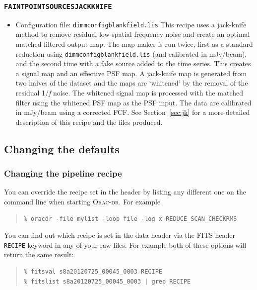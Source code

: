 \documentclass[twoside,11pt]{article}
\newcommand{\htmladdnormallink}[2]{#1}
\newcommand{\htmlref}[2]{#1}
\newcommand{\latexhtml}[2]{#1}
\newcommand{\xlabel}[1]{}
\renewcommand{\_}{\texttt{\symbol{95}}}
\newenvironment{myquote}{
   \color{MidnightBlue}\begin{quote}\begin{small}}{
   \end{small}\end{quote}
}
\newcommand{\oracdr}{\htmladdnormallink{\textsc{Orac-dr}}{http://www.oracdr.org/oracdr}}
\newcommand{\drrecipe}[1]{\texttt{#1}}
\newcommand{\file}[1]{\texttt{#1}}
\newcommand{\cref}[3]{\latexhtml{#1~\ref{#2}}{\htmlref{#3}{#2}}}
\renewenvironment{myquote}{
      \begin{quote}\begin{small}}{
      \end{small}\end{quote}
   }
\begin{document}
\subsubsection{\xlabel{faintjk}\drrecipe{FAINT\_POINT\_SOURCES\_JACKKNIFE}}
\begin{itemize}
\item Configuration file: \file{dimmconfig\_blank\_field.lis}
\newline\newline
This recipe uses a
\htmladdnormallink{jack-knife}{http://en.wikipedia.org/wiki/Jackknife_resampling}
method to remove residual low-spatial
frequency noise and create an optimal matched-filtered output map. The
map-maker is run twice, first as a standard reduction using
\file{dimmconfig\_blank\_field.lis} (and calibrated in mJy/beam), and the
second time with a fake
source added to the time series. This creates a signal map and an
effective PSF map. A jack-knife map is generated from two halves of
the dataset and the maps are `whitened' by the removal of the residual
1/\emph{f} noise. The whitened signal map is processed with the
matched filter using the whitened PSF map as the PSF input. The data
are calibrated in mJy/beam using a corrected FCF.
See \cref{Section}{sec:jk}{Example 2 -- Advanced pipeline method} for a
more-detailed description of this recipe and the files produced.
\end{itemize}

\subsection{Changing the defaults}
\label{sec:parameterfile}
\subsubsection{Changing the pipeline recipe}
You can override the recipe set in the header by listing any different
one on the command line when starting \oracdr. For example
\begin{myquote}
\begin{verbatim}
% oracdr -file mylist -loop file -log x REDUCE_SCAN_CHECKRMS
\end{verbatim}
\end{myquote}

You can find out which recipe is set in the data header via the FITS
header \texttt{RECIPE} keyword in any of your raw files.  For
example both of these options will return the same result:
\begin{myquote}
\begin{verbatim}
% fitsval s8a20120725_00045_0003 RECIPE
% fitslist s8a20120725_00045_0003 | grep RECIPE
\end{verbatim}
\end{myquote}
\end{document}
